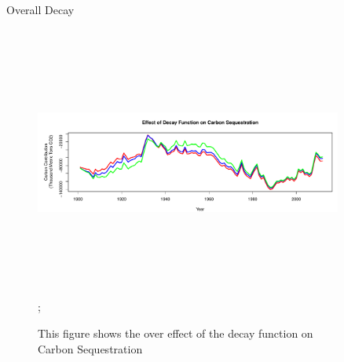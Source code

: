 \documentclass[final]{beamer}\usepackage[]{graphicx}\usepackage[]{color}
\newlength{\sepwid}
\newlength{\onecolwid}
\newlength{\twocolwid}
\begin{document}
\begin{frame}[t]
\begin{columns}[t]
\begin{column}{\twocolwid}
\begin{columns}[t,totalwidth=\twocolwid]
\begin{column}{\onecolwid}
\begin{block}{Overall Decay}
\begin{center}
\begin{figure}
    {\includegraphics[width=1\linewidth, height=9cm]{DecayPlotOverall.pdf}};
    \caption{This figure shows the over effect of the decay function on Carbon Sequestration}
\end{figure}
\end{center}

\end{block}


\end{column} %

\end{columns} %

\end{column} %

\begin{column}{\sepwid}\end{column} %

\begin{column}{\onecolwid} %



\end{column}
\end{columns}
\end{frame}
\end{document}
